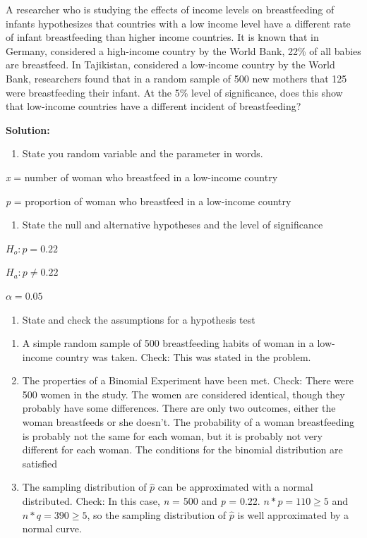 \documentclass[
]{book}
\providecommand{\tightlist}{%
  \setlength{\itemsep}{0pt}\setlength{\parskip}{0pt}}
\begin{document}
A researcher who is studying the effects of income levels on breastfeeding of infants hypothesizes that countries with a low income level have a different rate of infant breastfeeding than higher income countries. It is known that in Germany, considered a high-income country by the World Bank, 22\% of all babies are breastfeed. In Tajikistan, considered a low-income country by the World Bank, researchers found that in a random sample of 500 new mothers that 125 were breastfeeding their infant. At the 5\% level of significance, does this show that low-income countries have a different incident of breastfeeding?

\textbf{Solution:}

\begin{enumerate}
\def\labelenumi{\arabic{enumi}.}
\tightlist
\item
  State you random variable and the parameter in words.
\end{enumerate}

\emph{x} = number of woman who breastfeed in a low-income country

\emph{p} = proportion of woman who breastfeed in a low-income country

\begin{enumerate}
\def\labelenumi{\arabic{enumi}.}
\setcounter{enumi}{1}
\tightlist
\item
  State the null and alternative hypotheses and the level of significance
\end{enumerate}

\(H_o:p=0.22\)

\(H_a:p\ne0.22\)

\(\alpha=0.05\)

\begin{enumerate}
\def\labelenumi{\arabic{enumi}.}
\setcounter{enumi}{2}
\tightlist
\item
  State and check the assumptions for a hypothesis test
\end{enumerate}

\begin{enumerate}
\def\labelenumi{\alph{enumi}.}
\item
  A simple random sample of 500 breastfeeding habits of woman in a low-income country was taken. Check: This was stated in the problem.
\item
  The properties of a Binomial Experiment have been met. Check: There were 500 women in the study. The women are considered identical, though they probably have some differences. There are only two outcomes, either the woman breastfeeds or she doesn't. The probability of a woman breastfeeding is probably not the same for each woman, but it is probably not very different for each woman. The conditions for the binomial distribution are satisfied
\item
  The sampling distribution of \(\hat{p}\) can be approximated with a normal distributed. Check: In this case, \emph{n} = 500 and \emph{p} = 0.22. \(n*p= 110\ge5\) and \(n*q=390\ge5\), so the sampling distribution of \(\hat{p}\) is well approximated by a normal curve.
\end{enumerate}
\end{document}
